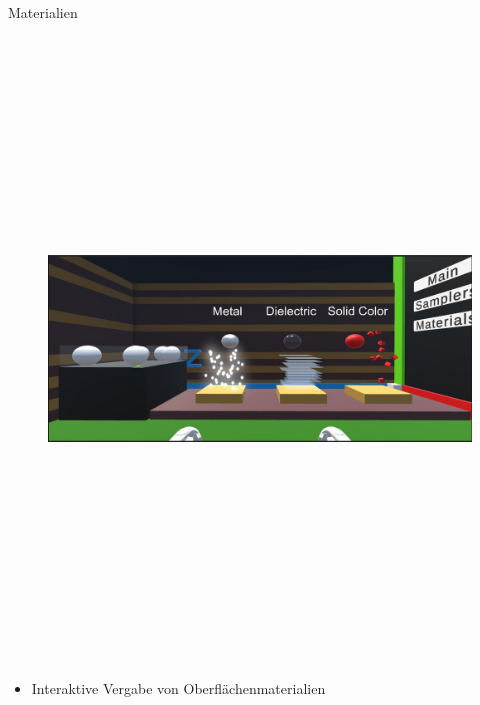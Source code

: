 \documentclass[final,hyperref={pdfpagelabels=false}]{beamer}
\begin{document}
\begin{frame}[t]
\begin{columns}[t]
\begin{column}{.465\textwidth}
\begin{block}{Materialien}
    \begin{figure}
    	\center
        \includegraphics[height=16.5cm]{sphereCreating}
    \end{figure}


    

	\begin{itemize}
		\item Interaktive Vergabe von Oberflächenmaterialien
	\end{itemize}


\end{block}
\end{column}
\end{columns}
\end{frame}
\end{document}
